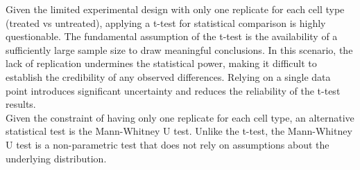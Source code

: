 \documentclass[a4paper,english,12pt,bibliography=totoc]{scrreprt}
\begin{document}

Given the limited experimental design with only one replicate for each cell type (treated vs untreated), applying a t-test for statistical comparison is highly questionable. The fundamental assumption of the t-test is the availability of a sufficiently large sample size to draw meaningful conclusions. In this scenario, the lack of replication undermines the statistical power, making it difficult to establish the credibility of any observed differences. Relying on a single data point introduces significant uncertainty and reduces the reliability of the t-test results. \\

Given the constraint of having only one replicate for each cell type, an alternative statistical test is the Mann-Whitney U test. Unlike the t-test, the Mann-Whitney U test is a non-parametric test that does not rely on assumptions about the underlying distribution.\\
\end{document}
